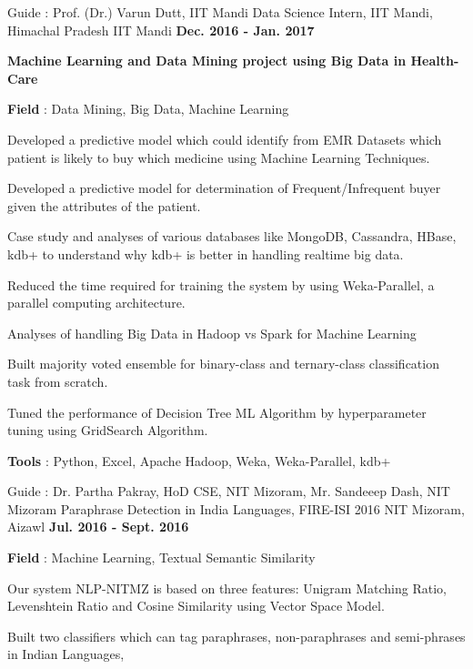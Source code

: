 \begin{cventries}
    \cventry
    {Guide : Prof. (Dr.) Varun Dutt, IIT Mandi}
    {Data Science Intern, IIT Mandi, Himachal Pradesh}
    {IIT Mandi}
    {\textbf{Dec. 2016 - Jan. 2017}}
    {
      \begin{cvitems}
        \item\textbf {Machine Learning and Data Mining project using Big Data in Health-Care}
        \item{\textbf{Field} : Data Mining, Big Data, Machine Learning}
        \item{Developed a predictive model which could identify from EMR Datasets which patient is likely to buy which medicine using Machine Learning Techniques.}
        \item{Developed a predictive model for determination of Frequent/Infrequent buyer given the attributes of the patient.}
        \item{Case study and analyses of various databases like MongoDB, Cassandra, HBase, kdb+ to understand why kdb+ is better in handling realtime big data.}
        \item{Reduced the time required for training the system by using Weka-Parallel, a parallel computing architecture.}
        \item{Analyses of handling Big Data in Hadoop vs Spark for Machine Learning}
        \item{Built majority voted ensemble for binary-class and ternary-class classification task from scratch.}
        \item{Tuned the performance of Decision Tree ML Algorithm by hyperparameter tuning using GridSearch Algorithm.}
        \item {\textbf{Tools} : Python, Excel, Apache Hadoop, Weka, Weka-Parallel, kdb+}
      \end{cvitems}
    }
     \cventry
    {Guide : Dr. Partha Pakray, HoD CSE, NIT Mizoram, Mr. Sandeeep Dash, NIT Mizoram}
    {Paraphrase Detection in India Languages, FIRE-ISI 2016}
    {NIT Mizoram, Aizawl}
    {\textbf{Jul. 2016 - Sept. 2016}}
    {
      \begin{cvitems}
      \item{\textbf{Field} : Machine Learning, Textual Semantic Similarity}
        \item {Our system  NLP-NITMZ is based on three features: Unigram Matching Ratio, Levenshtein Ratio and Cosine Similarity using Vector Space Model.}
        \item {Built two classifiers which can tag paraphrases, non-paraphrases and semi-phrases in Indian Languages,
}
\end{cvitems}}
\end{cventries}
